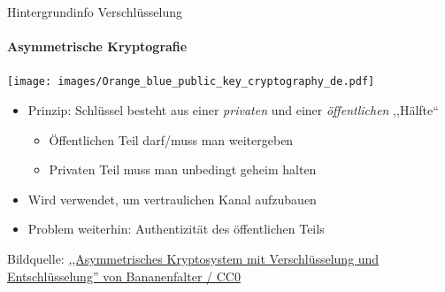\begin{frame}{Hintergrundinfo Verschlüsselung}
  \framesubtitle{Asymmetrische Kryptografie}
  \begin{center}
    \texttt{[image: images/Orange\_blue\_public\_key\_cryptography\_de.pdf]}
  \end{center}
  \begin{itemize}
    \item Prinzip: Schlüssel besteht aus einer \emph{privaten} und einer \emph{öffentlichen} ,,Hälfte``
    \begin{itemize}
      \item Öffentlichen Teil darf/muss man weitergeben
      \item Privaten Teil muss man unbedingt geheim halten
    \end{itemize}
    \item Wird verwendet, um vertraulichen Kanal aufzubauen
    \item Problem weiterhin: Authentizität des öffentlichen Teils
  \end{itemize}
  \tiny Bildquelle: \href{https://commons.wikimedia.org/wiki/File:Orange_blue_public_key_cryptography_de.svg}{,,Asymmetrisches Kryptosystem mit Verschlüsselung und Entschlüsselung'' von Bananenfalter / CC0}
\end{frame}

